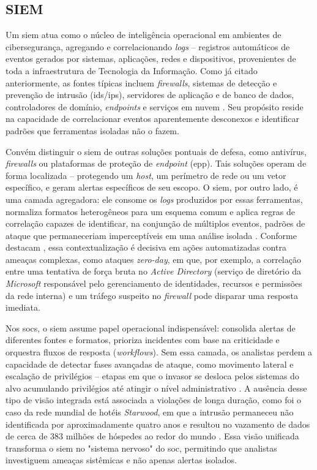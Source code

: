 \subsection{SIEM}

Um \gls{siem} atua como o núcleo de inteligência operacional em ambientes de cibersegurança, agregando e correlacionando \textit{logs} -- registros automáticos de eventos gerados por sistemas, aplicações, redes e dispositivos, provenientes de toda a infraestrutura de Tecnologia da Informação. 
Como já citado anteriormente, as fontes típicas incluem \textit{firewalls}, sistemas de detecção e prevenção de intrusão (\gls{ids}/\acrshort{ips}), servidores de aplicação e de banco de dados, controladores de domínio, \textit{endpoints} e serviços em nuvem \cite{gonzalez2021siem}. 
Seu propósito reside na capacidade de correlacionar eventos aparentemente desconexos e identificar padrões que ferramentas isoladas não o fazem.

Convém distinguir o \gls{siem} de outras soluções pontuais de defesa, como antivírus, \textit{firewalls} ou plataformas de proteção de \textit{endpoint} (\acrshort{epp}). 
Tais soluções operam de forma localizada -- protegendo um \textit{host}, um perímetro de rede ou um vetor específico, e geram alertas específicos de seu escopo. 
O \gls{siem}, por outro lado, é uma camada agregadora: ele consome os \textit{logs} produzidos por essas ferramentas, normaliza formatos heterogêneos para um esquema comum e aplica regras de correlação capazes de identificar, na conjunção de múltiplos eventos, padrões de ataque que permaneceriam imperceptíveis em uma análise isolada \cite{gonzalez2021siem, sheeraz2024siem}.
Conforme destacam , essa contextualização é decisiva em ações automatizadas contra ameaças complexas, como ataques \textit{zero-day}, em que, por exemplo, a correlação entre uma tentativa de força bruta no \textit{Active Directory} (serviço de diretório da \textit{Microsoft} responsável pelo gerenciamento de identidades, recursos e permissões da rede interna) e um tráfego suspeito no \textit{firewall} pode disparar uma resposta imediata.

Nos \gls{soc}s, o \gls{siem} assume papel operacional indispensável: 
consolida alertas de diferentes fontes e formatos, prioriza incidentes com base na criticidade e orquestra fluxos de resposta (\textit{workflows}). 
Sem essa camada, os analistas perdem a capacidade de detectar fases avançadas de ataque, como movimento lateral e escalação de privilégios -- etapas em que o invasor se desloca pelos sistemas do alvo acumulando privilégios até atingir o nível administrativo \cite{PodzinsRomanovs}. 
A ausência desse tipo de visão integrada está associada a violações de longa duração, como foi o caso da rede mundial de hotéis \textit{Starwood}, em que a intrusão permaneceu não identificada por aproximadamente quatro anos e resultou no vazamento de dados de cerca de 383 milhões de hóspedes ao redor do mundo \cite{Marriot}. 
Essa visão unificada transforma o \gls{siem} no "sistema nervoso" do \gls{soc}, permitindo que analistas investiguem ameaças sistêmicas e não apenas alertas isolados.

